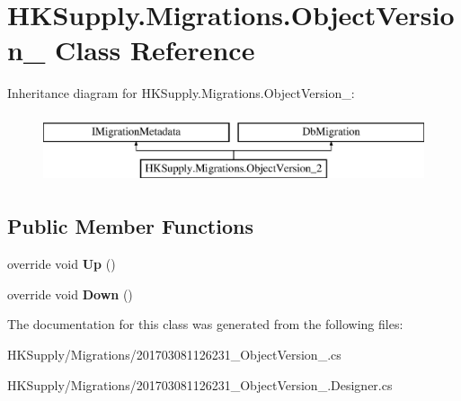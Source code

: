 \hypertarget{class_h_k_supply_1_1_migrations_1_1_object_version__2}{}\section{H\+K\+Supply.\+Migrations.\+Object\+Version\+\_ Class Reference}
\label{class_h_k_supply_1_1_migrations_1_1_object_version__2}
Inheritance diagram for H\+K\+Supply.\+Migrations.\+Object\+Version\+\_\+:\begin{figure}[H]
\begin{center}
\leavevmode
\includegraphics[height=2.000000cm]{class_h_k_supply_1_1_migrations_1_1_object_version__2}
\end{center}
\end{figure}
\subsection*{Public Member Functions}
\begin{DoxyCompactItemize}
\item 
\mbox{\label{class_h_k_supply_1_1_migrations_1_1_object_version__2_a3cfd619c6809aa44c8f6ad32cfe652c8}} 
override void {\bfseries Up} ()
\item 
\mbox{\label{class_h_k_supply_1_1_migrations_1_1_object_version__2_a55a4dc5c3c85c49aba48c2fcf265f5d3}} 
override void {\bfseries Down} ()
\end{DoxyCompactItemize}


The documentation for this class was generated from the following files\+:\begin{DoxyCompactItemize}
\item 
H\+K\+Supply/\+Migrations/201703081126231\+\_\+\+Object\+Version\+\_.\+cs\item 
H\+K\+Supply/\+Migrations/201703081126231\+\_\+\+Object\+Version\+\_.\+Designer.\+cs\end{DoxyCompactItemize}
